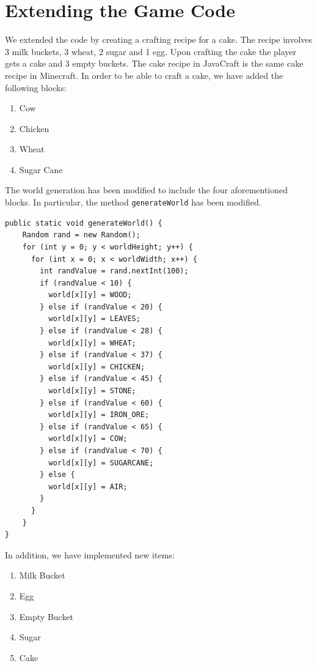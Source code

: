 \section{Extending the Game Code} \label{section: git}
We extended the code by creating a crafting recipe for a cake. The recipe involves 3 milk buckets, 3 wheat, 2 sugar and 1 egg. Upon crafting the cake the player gets a cake and 3 empty buckets. The cake recipe in JavaCraft is the same cake recipe in Minecraft.
In order to be able to craft a cake, we have added the following blocks:
\begin{enumerate}
    \item Cow
    \item Chicken
    \item Wheat
    \item Sugar Cane
\end{enumerate}

The world generation has been modified to include the four aforementioned blocks. In particular, the method \texttt{generateWorld} has been modified.

\begin{lstlisting}
public static void generateWorld() {
    Random rand = new Random();
    for (int y = 0; y < worldHeight; y++) {
      for (int x = 0; x < worldWidth; x++) {
        int randValue = rand.nextInt(100);
        if (randValue < 10) {
          world[x][y] = WOOD;
        } else if (randValue < 20) {
          world[x][y] = LEAVES;
        } else if (randValue < 28) {
          world[x][y] = WHEAT;
        } else if (randValue < 37) {
          world[x][y] = CHICKEN;
        } else if (randValue < 45) {
          world[x][y] = STONE;
        } else if (randValue < 60) {
          world[x][y] = IRON_ORE;
        } else if (randValue < 65) {
          world[x][y] = COW;
        } else if (randValue < 70) {
          world[x][y] = SUGARCANE;
        } else {
          world[x][y] = AIR;
        }
      }
    }
}
\end{lstlisting}

In addition, we have implemented new items:

\begin{enumerate}
    \item Milk Bucket
    \item Egg
    \item Empty Bucket
    \item Sugar
    \item Cake
\end{enumerate}

